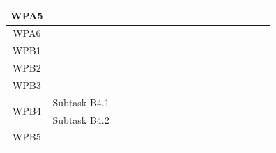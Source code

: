\documentclass[a4paper,11pt]{article}
\begin{document}
\begin{table}
\begin{center}
{\begin{tabular}{c|c|c|c|c|c|c|c|c|c|c|c|c|c|c|c|c|c|}
					\multirow{1}{*}{WPA5} &
					\multicolumn{1}{|r||}{} &     &     &     &     &     &     &     &     &     &     &  \oc   & \br    &     &     &     &  \\ \hline \hline
					
					\multirow{1}{*}{WPA6} &
					\multicolumn{1}{|r||}{} &     &     &     &     &     &     &     &     &     &     &     & \oc    &  \br   &     &     &  \\ \hline \hline
					
					\multirow{1}{*}{WPB1} &
					\multicolumn{1}{|r||}{} &     &     &     &     &     &     &     &     & \br    &     &     &     &     &     &     &  \\ \hline \hline
					
					\multirow{1}{*}{WPB2} &
					\multicolumn{1}{|r||}{} &     &     &     &     &     &     &     &     & \oc    & \br    &  \br   &     &     &     &     &  \\ \hline \hline
					
					\multirow{1}{*}{WPB3} &
					\multicolumn{1}{|r||}{} &     &     &     &     &     &     &     &     &     &     &     &  \br   &     &     &     &  \\ \hline \hline
					
					\multirow{2}{*}{WPB4} &
					\multicolumn{1}{|r||}{Subtask B4.1} &  &  &     &     &     &     &     &     &     &     &     &     & \oc    &  \br   &     &     \\ \cline{2-18} &
					\multicolumn{1}{|r||}{Subtask B4.2} &  &  & &  &     &     &     &     &     &     &     &     &     & \oc    & \br    &     \\ \hline \hline
					
					\multirow{1}{*}{WPB5} &
					\multicolumn{1}{|r||}{} &     &     &     &     &     &     &     &     &     &     &     &     &     &     &   \oc  & \br \\ \hline \hline
					

\end{tabular}}
\end{center}
\end{table}
\end{document}
